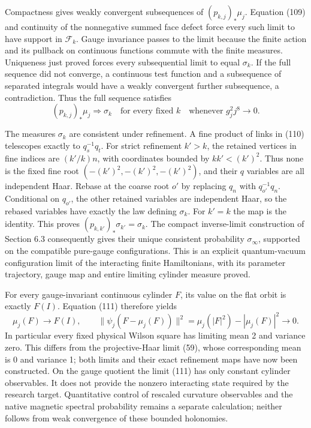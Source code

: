 \documentclass[
  11pt,
]{article}
\begin{document}
Compactness gives weakly convergent subsequences of
\((p_{k,j})_*\mu_j\). Equation (109) and continuity of the nonnegative
summed face defect force every such limit to have support in
\(\mathcal F_k\). Gauge invariance passes to the limit because the
finite action and its pullback on continuous functions commute with the
finite measures. Uniqueness just proved forces every subsequential limit
to equal \(\sigma_k\). If the full sequence did not converge, a
continuous test function and a subsequence of separated integrals would
have a weakly convergent further subsequence, a contradiction. Thus the
full sequence satisfies \[
 (p_{k,j})_*\mu_j\Longrightarrow\sigma_k
 \quad\text{for every fixed }k
 \quad\text{whenever }g_j^2j^8\to0 .
 \tag{111}
\]

The measures \(\sigma_k\) are consistent under refinement. A fine
product of links in (110) telescopes exactly to \(q_s^{-1}q_t\). For
strict refinement \(k'>k\), the retained vertices in fine indices are
\((k'/k)n\), with coordinates bounded by \(kk'<(k')^2\). Thus none is
the fixed fine root \((-(k')^2,-(k')^2,-(k')^2)\), and their \(q\)
variables are all independent Haar. Rebase at the coarse root \(o'\) by
replacing \(q_n\) with \(q_{o'}^{-1}q_n\). Conditional on \(q_{o'}\),
the other retained variables are independent Haar, so the rebased
variables have exactly the law defining \(\sigma_k\). For \(k'=k\) the
map is the identity. This proves \((p_{k,k'})_*\sigma_{k'}=\sigma_k\).
The compact inverse-limit construction of Section 6.3 consequently gives
their unique consistent probability \(\sigma_\infty\), supported on the
compatible pure-gauge configurations. This is an explicit quantum-vacuum
configuration limit of the interacting finite Hamiltonians, with its
parameter trajectory, gauge map and entire limiting cylinder measure
proved.

For every gauge-invariant continuous cylinder \(F\), its value on the
flat orbit is exactly \(F(I)\). Equation (111) therefore yields \[
 \mu_j(F)\to F(I),\qquad
 \|\psi_j(F-\mu_j(F))\|^2
 =\mu_j(|F|^2)-|\mu_j(F)|^2\longrightarrow0 .
 \tag{112}
\] In particular every fixed physical Wilson square has limiting mean 2
and variance zero. This differs from the projective-Haar limit (59),
whose corresponding mean is 0 and variance 1; both limits and their
exact refinement maps have now been constructed. On the gauge quotient
the limit (111) has only constant cylinder observables. It does not
provide the nonzero interacting state required by the research target.
Quantitative control of rescaled curvature observables and the native
magnetic spectral probability remains a separate calculation; neither
follows from weak convergence of these bounded holonomies.
\end{document}
